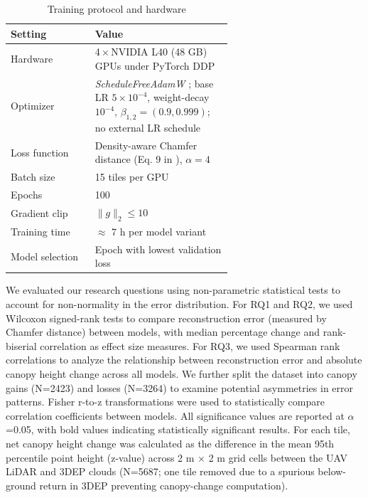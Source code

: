 \documentclass[remotesensing,article,submit,pdftex,moreauthors]{Definitions/mdpi}
\begin{document}
\begin{table}[htbp]
  \centering
  \caption{Training protocol and hardware}
  \label{tab:training_protocol}
  \begin{tabular}{lp{0.62\linewidth}}
    \toprule
    \textbf{Setting} & \textbf{Value} \\
    \midrule
    Hardware      & 4\,×\,NVIDIA L40 (48 GB) GPUs under PyTorch DDP \\
    Optimizer     & \textit{ScheduleFreeAdamW} \cite{defazio_road_2024}; base LR $5\times10^{-4}$, weight-decay $10^{-4}$, $\beta_{1,2}=(0.9,0.999)$; no external LR schedule \\
    Loss function & Density-aware Chamfer distance (Eq. 9 in \cite{wu_density-aware_2021}), $\alpha=4$ \\
    Batch size    & 15 tiles per GPU \\
    Epochs        & 100 \\
    Gradient clip & $\lVert g\rVert_2 \le 10$ \\
    Training time & $\approx$ 7 h per model variant \\
    Model selection & Epoch with lowest validation loss \\
    \bottomrule
  \end{tabular}
\end{table}

We evaluated our research questions using non-parametric statistical tests to account for non-normality in the error distribution. For RQ1 and RQ2, we used Wilcoxon signed-rank tests to compare reconstruction error (measured by Chamfer distance) between models, with median percentage change and rank-biserial correlation as effect size measures. For RQ3, we used Spearman rank correlations to analyze the relationship between reconstruction error and absolute canopy height change across all models. We further split the dataset into canopy gains (N=2423) and losses (N=3264) to examine potential asymmetries in error patterns. Fisher r-to-z transformations were used to statistically compare correlation coefficients between models. All significance values are reported at $\alpha$=0.05, with bold values indicating statistically significant results.
For each tile, net canopy height change was calculated as the difference in the mean 95th percentile point height (z-value) across 2 m × 2 m grid cells between the UAV LiDAR and 3DEP clouds (N=5687; one tile removed due to a spurious below-ground return in 3DEP preventing canopy-change computation).
\end{document}
